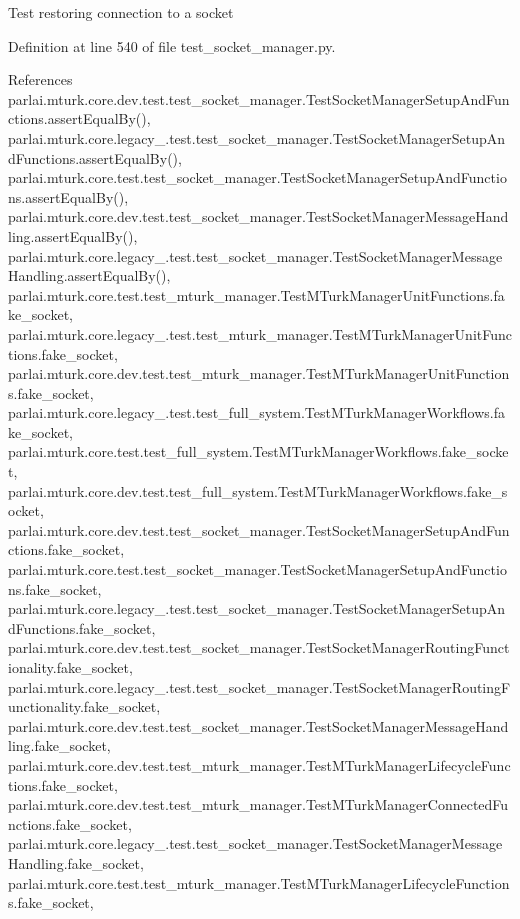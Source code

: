 \begin{DoxyVerb}Test restoring connection to a socket\end{DoxyVerb}
 

Definition at line 540 of file test\+\_\+socket\+\_\+manager.\+py.



References parlai.\+mturk.\+core.\+dev.\+test.\+test\+\_\+socket\+\_\+manager.\+Test\+Socket\+Manager\+Setup\+And\+Functions.\+assert\+Equal\+By(), parlai.\+mturk.\+core.\+legacy\+\_.\+test.\+test\+\_\+socket\+\_\+manager.\+Test\+Socket\+Manager\+Setup\+And\+Functions.\+assert\+Equal\+By(), parlai.\+mturk.\+core.\+test.\+test\+\_\+socket\+\_\+manager.\+Test\+Socket\+Manager\+Setup\+And\+Functions.\+assert\+Equal\+By(), parlai.\+mturk.\+core.\+dev.\+test.\+test\+\_\+socket\+\_\+manager.\+Test\+Socket\+Manager\+Message\+Handling.\+assert\+Equal\+By(), parlai.\+mturk.\+core.\+legacy\+\_.\+test.\+test\+\_\+socket\+\_\+manager.\+Test\+Socket\+Manager\+Message\+Handling.\+assert\+Equal\+By(), parlai.\+mturk.\+core.\+test.\+test\+\_\+mturk\+\_\+manager.\+Test\+M\+Turk\+Manager\+Unit\+Functions.\+fake\+\_\+socket, parlai.\+mturk.\+core.\+legacy\+\_.\+test.\+test\+\_\+mturk\+\_\+manager.\+Test\+M\+Turk\+Manager\+Unit\+Functions.\+fake\+\_\+socket, parlai.\+mturk.\+core.\+dev.\+test.\+test\+\_\+mturk\+\_\+manager.\+Test\+M\+Turk\+Manager\+Unit\+Functions.\+fake\+\_\+socket, parlai.\+mturk.\+core.\+legacy\+\_.\+test.\+test\+\_\+full\+\_\+system.\+Test\+M\+Turk\+Manager\+Workflows.\+fake\+\_\+socket, parlai.\+mturk.\+core.\+test.\+test\+\_\+full\+\_\+system.\+Test\+M\+Turk\+Manager\+Workflows.\+fake\+\_\+socket, parlai.\+mturk.\+core.\+dev.\+test.\+test\+\_\+full\+\_\+system.\+Test\+M\+Turk\+Manager\+Workflows.\+fake\+\_\+socket, parlai.\+mturk.\+core.\+dev.\+test.\+test\+\_\+socket\+\_\+manager.\+Test\+Socket\+Manager\+Setup\+And\+Functions.\+fake\+\_\+socket, parlai.\+mturk.\+core.\+test.\+test\+\_\+socket\+\_\+manager.\+Test\+Socket\+Manager\+Setup\+And\+Functions.\+fake\+\_\+socket, parlai.\+mturk.\+core.\+legacy\+\_.\+test.\+test\+\_\+socket\+\_\+manager.\+Test\+Socket\+Manager\+Setup\+And\+Functions.\+fake\+\_\+socket, parlai.\+mturk.\+core.\+dev.\+test.\+test\+\_\+socket\+\_\+manager.\+Test\+Socket\+Manager\+Routing\+Functionality.\+fake\+\_\+socket, parlai.\+mturk.\+core.\+legacy\+\_.\+test.\+test\+\_\+socket\+\_\+manager.\+Test\+Socket\+Manager\+Routing\+Functionality.\+fake\+\_\+socket, parlai.\+mturk.\+core.\+dev.\+test.\+test\+\_\+socket\+\_\+manager.\+Test\+Socket\+Manager\+Message\+Handling.\+fake\+\_\+socket, parlai.\+mturk.\+core.\+dev.\+test.\+test\+\_\+mturk\+\_\+manager.\+Test\+M\+Turk\+Manager\+Lifecycle\+Functions.\+fake\+\_\+socket, parlai.\+mturk.\+core.\+dev.\+test.\+test\+\_\+mturk\+\_\+manager.\+Test\+M\+Turk\+Manager\+Connected\+Functions.\+fake\+\_\+socket, parlai.\+mturk.\+core.\+legacy\+\_.\+test.\+test\+\_\+socket\+\_\+manager.\+Test\+Socket\+Manager\+Message\+Handling.\+fake\+\_\+socket, parlai.\+mturk.\+core.\+test.\+test\+\_\+mturk\+\_\+manager.\+Test\+M\+Turk\+Manager\+Lifecycle\+Functions.\+fake\+\_\+socket, 